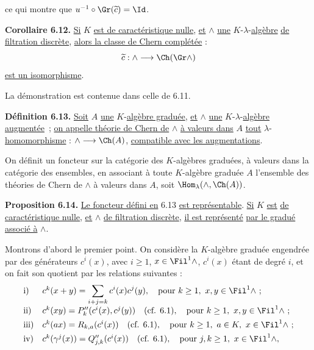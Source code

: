 
ce qui
montre que \(u^{-1}\circ\Gr(\widetilde c)=\Id\).

\textbf{Corollaire 6.12.} \uline{Si} \(K\) \uline{est de caractéristique nulle}, \uline{et} \(\mathord{\wedge}\) \uline{une} \(K\)-\(\lambda\)-\uline{algèbre} \uline{de filtration discrète}, \uline{alors la classe de Chern complétée} :
\[
  \widetilde c:\mathord{\wedge}\longrightarrow \Ch(\Gr\mathord{\wedge})
\]
\uline{est un isomorphisme}.

La démonstration est contenue dans celle de 6.11.

\textbf{Définition 6.13.} \uline{Soit} \(A\) \uline{une} \(K\)-\uline{algèbre graduée}, \uline{et} \(\mathord{\wedge}\) \uline{une} \(K\)-\(\lambda\)-\uline{algèbre} \uline{augmentée}~; \uline{on appelle théorie de Chern de} \(\mathord{\wedge}\) \uline{à valeurs dans} \(A\) \uline{tout} \(\lambda\)-\uline{homomorphisme} : \(\mathord{\wedge}\longrightarrow \Ch(A)\), \uline{compatible avec les augmentations}.

On définit un foncteur sur la catégorie des \(K\)-algèbres graduées, à valeurs dans la catégorie des ensembles, en associant à toute \(K\)-algèbre graduée \(A\) l'ensemble des théories de Chern de \(\mathord{\wedge}\) à valeurs dans \(A\), soit \(\Hom_\lambda(\mathord{\wedge},\Ch(A))\).

\textbf{Proposition 6.14.} \uline{Le foncteur défini en} 6.13 \uline{est représentable}. \uline{Si} \(K\) \uline{est} \uline{de caractéristique nulle}, \uline{et} \(\mathord{\wedge}\) \uline{de filtration discrète}, \uline{il est représenté} \uline{par le gradué associé à} \(\mathord{\wedge}\).

Montrons d'abord le premier point. On considère la \(K\)-algèbre graduée engendrée par des générateurs \(c^i(x)\), avec \(i\ge1\), \(x\in\Fil^1\mathord{\wedge}\), \(c^i(x)\) étant de degré \(i\), et on fait son quotient par les relations suivantes :
\[
\begin{array}{ll}
\text{i)}&
 c^k(x+y)=\displaystyle\sum_{i+j=k}c^i(x)c^j(y),
 \quad\text{pour } k\ge1,\ x,y\in\Fil^1\mathord{\wedge}\ ;\\[0.8em]
\text{ii)}&
 c^k(xy)=P''_k(c^i(x),c^j(y))
 \quad(\text{cf. }6.1),
 \quad\text{pour } k\ge1,\ x,y\in\Fil^1\mathord{\wedge}\ ;\\[0.4em]
\text{iii)}&
 c^k(ax)=R_{k,a}(c^i(x)) \quad(\text{cf. }6.1),
 \quad\text{pour } k\ge1,\ a\in K,\ x\in\Fil^1\mathord{\wedge}\ ;\\[0.4em]
\text{iv)}&
 c^k(\gamma^j(x))=Q''_{j,k}(c^i(x))
 \quad(\text{cf. }6.1),
 \quad\text{pour } j,k\ge1,\ x\in\Fil^1\mathord{\wedge},
\end{array}
\]
